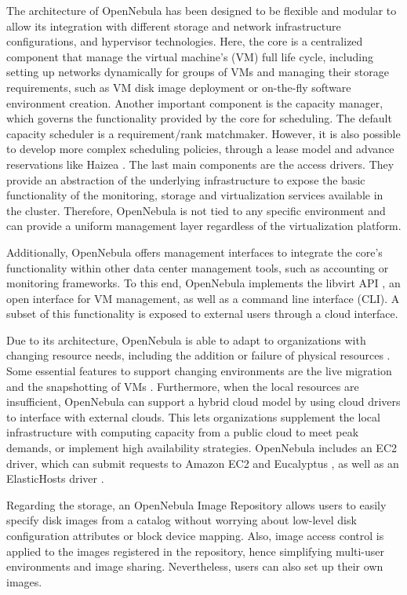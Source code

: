 The architecture of OpenNebula has been designed to be flexible and modular to allow its integration with different storage and network infrastructure configurations, and hypervisor technologies. Here, the core is a centralized component that manage the virtual machine's (VM) full life cycle, including setting up networks dynamically for groups of VMs and managing their storage requirements, such as VM disk image deployment or on-the-fly software environment creation. Another important component is the capacity manager, which governs the functionality provided by the core for scheduling. The default capacity scheduler is a requirement/rank matchmaker. However, it is also possible to develop more complex scheduling policies, through a lease model and advance reservations like Haizea \cite{haizea}. The last main components are the access drivers. They provide an abstraction of the underlying infrastructure to expose the basic functionality of the monitoring, storage and virtualization services available in the cluster. Therefore, OpenNebula is not tied to any specific environment and can provide a uniform management layer regardless of the virtualization platform.

Additionally, OpenNebula offers management interfaces to integrate the core's functionality within other data center management tools, such as accounting or monitoring frameworks. To this end, OpenNebula implements the libvirt API \cite{www/libvirt}, an open interface for VM management, as well as a command line interface (CLI). A subset of this functionality is exposed to external users through a cloud interface.

Due to its architecture, OpenNebula is able to adapt to organizations with changing re­source needs, including the addition or failure of physical resources \cite{sotomayorvirtual}. Some essential features to support changing environments are the live migration and the snapshotting of VMs \cite{www/opennebula}. Furthermore, when the local resources are insufficient, OpenNebula can support a hybrid cloud model by using cloud drivers to inter­face with external clouds. This lets organizations supplement the local infrastructure with computing capacity from a public cloud to meet peak demands, or implement high availability strategies. OpenNebula includes an EC2 driver, which can submit requests to Amazon EC2 \cite{www/amazonec2} and Eucalyptus \cite{nurmi2008eos}, as well as an ElasticHosts driver \cite{www/elastichosts}.

Regarding the storage, an OpenNebula Image Repository allows users to easily specify disk images from a catalog without worrying about low-level disk configuration attributes or block device mapping. Also, image access control is applied to the images registered in the repository, hence simplifying multi-user environments and image sharing. Nevertheless, users can also set up their own images. 




